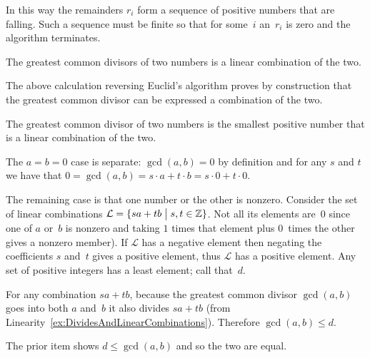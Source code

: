 \documentclass{ibl}  %
\begin{document}
\begin{bezoutproof}
\begin{problem}
\begin{exes}
\begin{answer}
  In this way the remainders $r_i$ form a sequence of positive numbers that
  are falling.
  Such a sequence must be finite so that for some~$i$ 
  an~$r_i$ is zero and the algorithm terminates.  
\end{answer}
\begin{exercise}[\midlength]
  The greatest common divisors of two numbers is a linear combination of 
  the two.
\end{exercise}
\begin{answer}
  The above calculation reversing Euclid's algorithm proves by
  construction that the greatest common divisor can be expressed 
  a combination of the two. 
\end{answer}
\begin{exercise}  
  The greatest common divisor of two numbers is the smallest positive
  number that is a linear combination of the two.
\end{exercise}
\begin{answer}
  The $a=b=0$ case is separate:
  $\gcd(a,b)=0$ by definition and for any $s$ and $t$ we
  have that $0=\gcd(a,b)=s\cdot a+t\cdot b=s\cdot 0+t\cdot 0$.

  The remaining case is that one number or the other is nonzero.
  Consider the set of linear combinations 
  $\mathcal{L}=\{sa+tb \bigm| s,t\in\mathbb{Z}\}$.
  Not all its elements are~$0$ since
  one of $a$ or~$b$ is nonzero and taking $1$ times that element
  plus $0$~times the other gives a nonzero member). 
  If $\mathcal{L}$ has a 
  negative element then negating the coefficients $s$ and~$t$ gives 
  a positive element, thus $\mathcal{L}$ has a positive element.
  Any set of positive integers has a least element;
  call that~$d$.

  For any combination $sa+tb$, because the greatest common divisor
  $\gcd(a,b)$ goes into both $a$ and~$b$ it also divides $sa+tb$  
  (from Linearity~\ref{ex:DividesAndLinearCombinations}).
  Therefore $\gcd(a,b)\leq d$.

  The prior item shows $d\leq\gcd(a,b)$ and so the two are equal. 





\end{answer}
\end{exes}
\end{problem}
\end{bezoutproof}
\end{document}
